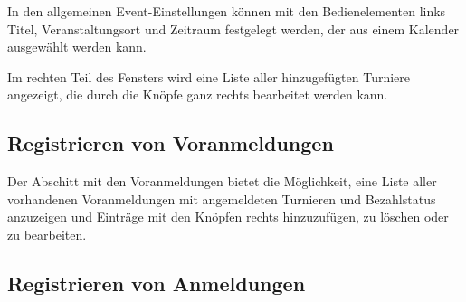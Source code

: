 \documentclass[11pt]{article}
\begin{document}
In den allgemeinen Event-Einstellungen können mit den Bedienelementen links Titel, Veranstaltungsort und Zeitraum festgelegt werden, der aus einem Kalender ausgewählt werden kann.

Im rechten Teil des Fensters wird eine Liste aller hinzugefügten Turniere angezeigt, die durch die Knöpfe ganz rechts bearbeitet werden kann.

\subsection{Registrieren von Voranmeldungen}


\vspace{1cm}

Der Abschitt mit den Voranmeldungen bietet die Möglichkeit, eine Liste aller vorhandenen Voranmeldungen mit angemeldeten Turnieren und Bezahlstatus anzuzeigen und Einträge mit den Knöpfen rechts hinzuzufügen, zu löschen oder zu bearbeiten.

\subsection{Registrieren von Anmeldungen}

\end{document}
